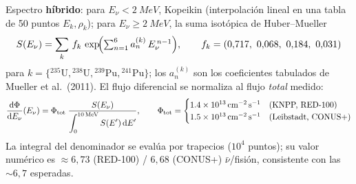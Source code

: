 \documentclass[11pt,a4paper]{article}
\newcommand{\Enu}{E_{\nu}}
\newcommand{\dd}{\mathrm{d}}
\begin{document}
Espectro \textbf{h\'ibrido}: para $\Enu<\SI{2}{MeV}$, Kopeikin (interpolaci\'on
lineal en una tabla de 50 puntos $E_{k},\rho_{k}$); para $\Enu\ge\SI{2}{MeV}$,
la suma isot\'opica de Huber--Mueller
\begin{equation}
  \label{eq:mueller}
  S(\Enu) = \sum_{k}\, f_{k}\,
            \exp\!\Bigl(\textstyle\sum_{n=1}^{6} a_{n}^{(k)}\,\Enu^{\,n-1}\Bigr),
  \qquad
  f_{k} = (0{,}717,\ 0{,}068,\ 0{,}184,\ 0{,}031)
\end{equation}
para $k=\{{}^{235}\mathrm{U},{}^{238}\mathrm{U},{}^{239}\mathrm{Pu},
{}^{241}\mathrm{Pu}\}$; los $a_{n}^{(k)}$ son los coeficientes tabulados de
Mueller et al.\ (2011). El flujo diferencial se normaliza al flujo
\emph{total} medido:
\begin{equation}
  \label{eq:flux_norm}
  \frac{\dd\Phi}{\dd\Enu}(\Enu)
  = \Phi_{\rm tot}\;
    \frac{S(\Enu)}{\displaystyle\int_{0}^{\SI{10}{MeV}} S(E')\,\dd E'},
  \qquad
  \Phi_{\rm tot} =
  \begin{cases}
    \SI{1.4e13}{cm^{-2}.s^{-1}} & \text{(KNPP, RED-100)}\\
    \SI{1.5e13}{cm^{-2}.s^{-1}} & \text{(Leibstadt, CONUS+)}
  \end{cases}
\end{equation}
La integral del denominador se eval\'ua por trapecios ($10^{4}$ puntos); su valor
num\'erico es $\approx 6{,}73$ (RED-100) / $6{,}68$ (CONUS+) $\bar\nu$/fisi\'on,
consistente con las $\sim 6{,}7$ esperadas.
\end{document}
